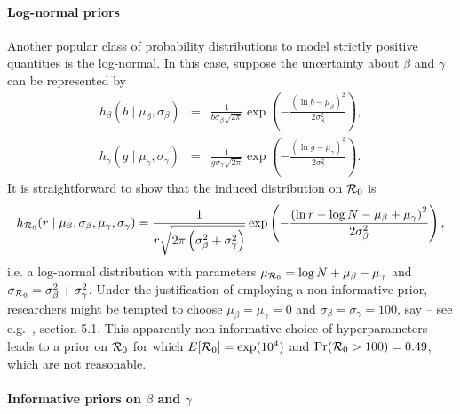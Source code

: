 \documentclass[alpha-refs]{wiley-article}
\newcommand{\rr}{ {\cal R}_0 }						%
\begin{document}
\paragraph{Log-normal priors}

Another popular class of probability distributions to model strictly positive quantities is the log-normal.
In this case, suppose the uncertainty about $\beta$ and $\gamma$ can be represented by
\begin{eqnarray*}
\nonumber
h_{\beta}(b \mid \mu_{\beta}, \sigma_{\beta}) &=& \frac{1}{b \sigma_{\beta}\sqrt{2\pi}} \exp\left( - \frac{ \left( \ln b - \mu_{\beta} \right)^2 }{2 \sigma_{\beta}^2} \right), \\
h_{\gamma}(g \mid \mu_{\gamma}, \sigma_{\gamma}) &=& \frac{1}{g \sigma_{\gamma}\sqrt{2\pi}} \exp\left( - \frac{ \left( \ln g - \mu_{\gamma} \right)^2 }{2 \sigma_{\gamma}^2} \right).
\end{eqnarray*}
It is straightforward to show that the induced distribution on $\rr$ is
\begin{equation}
 \label{eq:r0lognormal}
h_{\rr}( r \mid \mu_{\beta}, \sigma_{\beta}, \mu_{\gamma}, \sigma_{\gamma}) =   \frac{1}{r \sqrt{2\pi \left( \sigma_{\beta}^2 + \sigma_{\gamma}^2 \right) }} \exp\left( - \frac{ \left( \ln r - \log N - \mu_{\beta} + \mu_{\gamma}  \right)^2 }{2 \sigma_{\beta}^2} \right),
\end{equation}
i.e. a log-normal distribution with parameters $\mu_{\rr} = \log N + \mu_{\beta} - \mu_{\gamma}$ and $\sigma_{\rr} = \sigma_{\beta}^2 + \sigma_{\gamma}^2$.
Under the justification of employing a non-informative prior, researchers might be tempted to choose $\mu_{\beta} = \mu_{\gamma} = 0$ and $ \sigma_{\beta} = \sigma_{\gamma} = 100$, say -- see e.g.~\cite{Ho2018}, section 5.1.
This apparently non-informative choice of hyperparameters leads to a prior on $\rr$ for which  $E[\rr ] = \exp(10^4)$ and $\text{Pr}(\rr > 100) = 0.49$, which are not reasonable.

\paragraph{Informative priors on $\beta$ and $\gamma$}
\end{document}
